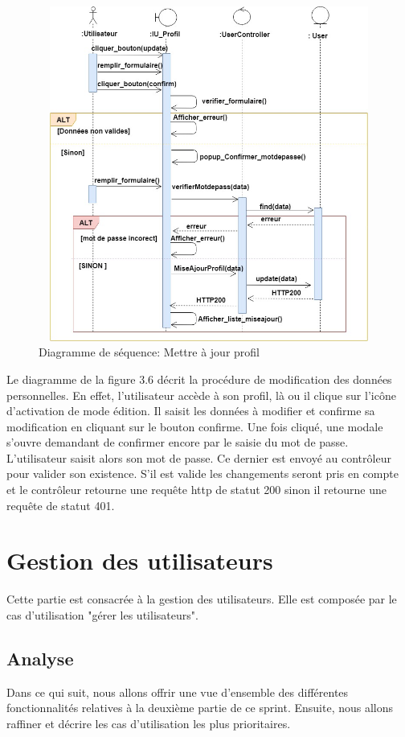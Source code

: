 \begin{figure}[H]
	\centering
	\includegraphics[height=11cm,width=14cm]{Majprofil-Page-1.jpg} 
	\caption{Diagramme de séquence: Mettre à jour profil}
	\label{Diagramme de séquence: Mettre à jour profil}
\end{figure}
Le diagramme de la figure 3.6 décrit la procédure de modification des données personnelles. En effet, l'utilisateur accède à son profil, là ou il clique sur l'icône d'activation de mode édition. Il saisit les données à modifier et  confirme sa modification en cliquant sur le bouton confirme. Une fois cliqué, une modale s'ouvre demandant de confirmer encore par le saisie du mot de passe. 
L'utilisateur saisit alors son mot de passe. Ce dernier est envoyé au contrôleur pour valider son existence. S'il est valide  les changements seront pris en compte et le contrôleur retourne une requête http de statut 200 sinon il retourne une requête de statut 401.

\section{Gestion des utilisateurs}
Cette partie est consacrée à la gestion des utilisateurs. Elle est composée  par le cas d'utilisation "gérer les utilisateurs". 
\subsection{Analyse}
Dans ce qui suit, nous allons offrir une vue d'ensemble des différentes fonctionnalités relatives à la deuxième partie de ce sprint. Ensuite, nous allons raffiner et décrire
les cas d'utilisation les plus prioritaires.
